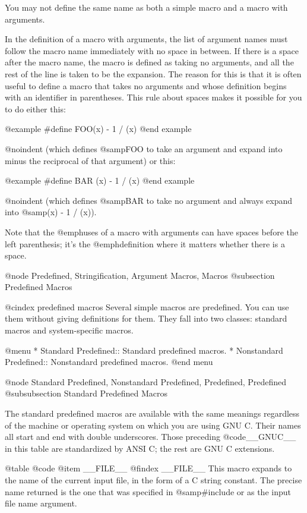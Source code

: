 {You may not define the same name as both a simple macro and a macro with
arguments.

In the definition of a macro with arguments, the list of argument names
must follow the macro name immediately with no space in between.  If there
is a space after the macro name, the macro is defined as taking no
arguments, and all the rest of the line is taken to be the expansion.  The
reason for this is that it is often useful to define a macro that takes no
arguments and whose definition begins with an identifier in parentheses.
This rule about spaces makes it possible for you to do either this:

@example
#define FOO(x) - 1 / (x)
@end example

@noindent
(which defines @samp{FOO} to take an argument and expand into minus the
reciprocal of that argument) or this:

@example
#define BAR (x) - 1 / (x)
@end example

@noindent
(which defines @samp{BAR} to take no argument and always expand into
@samp{(x) - 1 / (x)}).

Note that the @emph{uses} of a macro with arguments can have spaces before
the left parenthesis; it's the @emph{definition} where it matters whether
there is a space.

@node Predefined, Stringification, Argument Macros, Macros
@subsection Predefined Macros

@cindex predefined macros
Several simple macros are predefined.  You can use them without giving
definitions for them.  They fall into two classes: standard macros and
system-specific macros.

@menu
* Standard Predefined::     Standard predefined macros.
* Nonstandard Predefined::  Nonstandard predefined macros.
@end menu

@node Standard Predefined, Nonstandard Predefined, Predefined, Predefined
@subsubsection Standard Predefined Macros

The standard predefined macros are available with the same meanings
regardless of the machine or operating system on which you are using GNU C.
Their names all start and end with double underscores.  Those preceding
@code{__GNUC__} in this table are standardized by ANSI C; the rest are
GNU C extensions.

@table @code
@item __FILE__
@findex __FILE__
This macro expands to the name of the current input file, in the form of
a C string constant.  The precise name returned is the one that was
specified in @samp{#include} or as the input file name argument.

}
